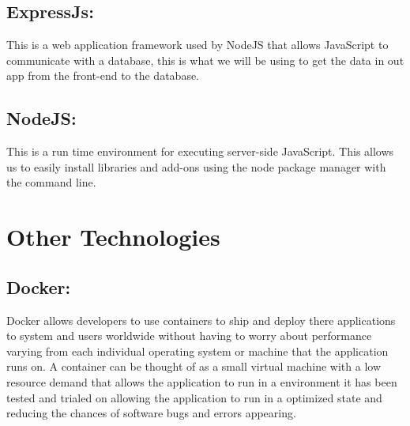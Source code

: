 \subsection{ExpressJs:}
This is a web application framework used by NodeJS that allows JavaScript to communicate with a database, this is what we will be using to get the data in out app from the front-end to the database.

\subsection{NodeJS:}
This is a run time environment for executing server-side JavaScript. This allows us to easily install libraries and add-ons using the node package manager with the command line.

\section{Other Technologies}

\subsection{Docker:}
Docker allows developers to use containers to ship and deploy there applications to system and users worldwide without having to worry about performance varying from each individual operating system or machine that the application runs on. A container can be thought of as a small virtual machine with a low resource demand that allows the application to run in a environment it has been tested and trialed on allowing the application to run in a optimized state and reducing the chances of software bugs and errors appearing.

